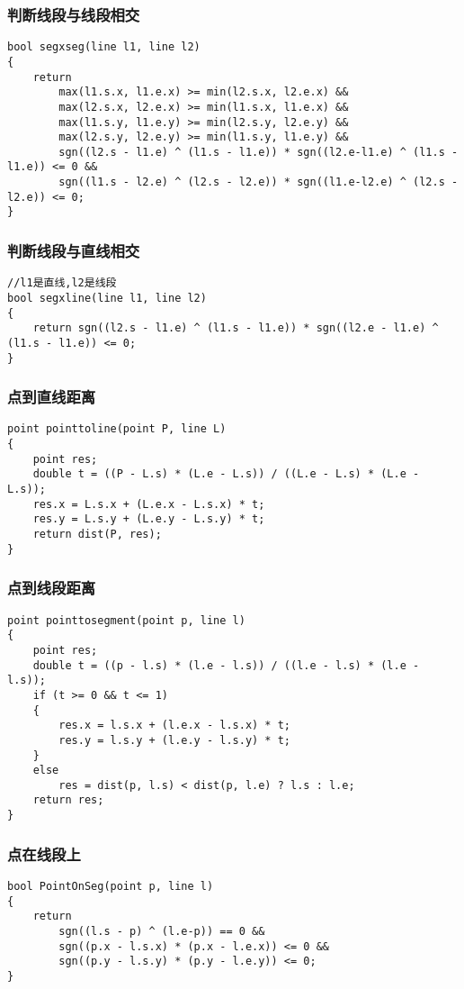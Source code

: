 \documentclass[a4]{article}
\begin{document}
\subsubsection{判断线段与线段相交}
\begin{lstlisting}
bool segxseg(line l1, line l2)
{
    return
        max(l1.s.x, l1.e.x) >= min(l2.s.x, l2.e.x) &&
        max(l2.s.x, l2.e.x) >= min(l1.s.x, l1.e.x) &&
        max(l1.s.y, l1.e.y) >= min(l2.s.y, l2.e.y) &&
        max(l2.s.y, l2.e.y) >= min(l1.s.y, l1.e.y) &&
        sgn((l2.s - l1.e) ^ (l1.s - l1.e)) * sgn((l2.e-l1.e) ^ (l1.s - l1.e)) <= 0 &&
        sgn((l1.s - l2.e) ^ (l2.s - l2.e)) * sgn((l1.e-l2.e) ^ (l2.s - l2.e)) <= 0;
}
\end{lstlisting}
\subsubsection{判断线段与直线相交}
\begin{lstlisting}
//l1是直线,l2是线段
bool segxline(line l1, line l2)
{
    return sgn((l2.s - l1.e) ^ (l1.s - l1.e)) * sgn((l2.e - l1.e) ^ (l1.s - l1.e)) <= 0;
}
\end{lstlisting}
\subsubsection{点到直线距离}
\begin{lstlisting}
point pointtoline(point P, line L)
{
    point res;
    double t = ((P - L.s) * (L.e - L.s)) / ((L.e - L.s) * (L.e - L.s));
    res.x = L.s.x + (L.e.x - L.s.x) * t;
    res.y = L.s.y + (L.e.y - L.s.y) * t;
    return dist(P, res);
}
\end{lstlisting}
\subsubsection{点到线段距离}
\begin{lstlisting}
point pointtosegment(point p, line l)
{
    point res;
    double t = ((p - l.s) * (l.e - l.s)) / ((l.e - l.s) * (l.e - l.s));
    if (t >= 0 && t <= 1)
    {
        res.x = l.s.x + (l.e.x - l.s.x) * t;
        res.y = l.s.y + (l.e.y - l.s.y) * t;
    }
    else
        res = dist(p, l.s) < dist(p, l.e) ? l.s : l.e;
    return res;
}
\end{lstlisting}
\subsubsection{点在线段上}
\begin{lstlisting}
bool PointOnSeg(point p, line l)
{
    return
        sgn((l.s - p) ^ (l.e-p)) == 0 &&
        sgn((p.x - l.s.x) * (p.x - l.e.x)) <= 0 &&
        sgn((p.y - l.s.y) * (p.y - l.e.y)) <= 0;
}
\end{lstlisting}
\end{document}
